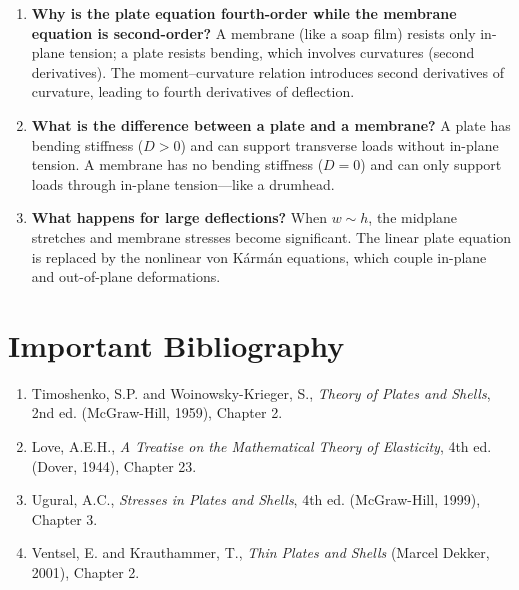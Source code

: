 \begin{enumerate}
\item \textbf{Why is the plate equation fourth-order while the membrane equation is second-order?}
A membrane (like a soap film) resists only in-plane tension; a plate resists bending, which involves curvatures (second derivatives). The moment--curvature relation introduces second derivatives of curvature, leading to fourth derivatives of deflection.

\item \textbf{What is the difference between a plate and a membrane?}
A plate has bending stiffness ($D > 0$) and can support transverse loads without in-plane tension. A membrane has no bending stiffness ($D = 0$) and can only support loads through in-plane tension---like a drumhead.

\item \textbf{What happens for large deflections?}
When $w \sim h$, the midplane stretches and membrane stresses become significant. The linear plate equation is replaced by the nonlinear von Kármán equations, which couple in-plane and out-of-plane deformations.
\end{enumerate}
\section*{Important Bibliography}

\begin{enumerate}
\item Timoshenko, S.P. and Woinowsky-Krieger, S., \textit{Theory of Plates and Shells}, 2nd ed. (McGraw-Hill, 1959), Chapter 2.
\item Love, A.E.H., \textit{A Treatise on the Mathematical Theory of Elasticity}, 4th ed. (Dover, 1944), Chapter 23.
\item Ugural, A.C., \textit{Stresses in Plates and Shells}, 4th ed. (McGraw-Hill, 1999), Chapter 3.
\item Ventsel, E. and Krauthammer, T., \textit{Thin Plates and Shells} (Marcel Dekker, 2001), Chapter 2.
\end{enumerate}

